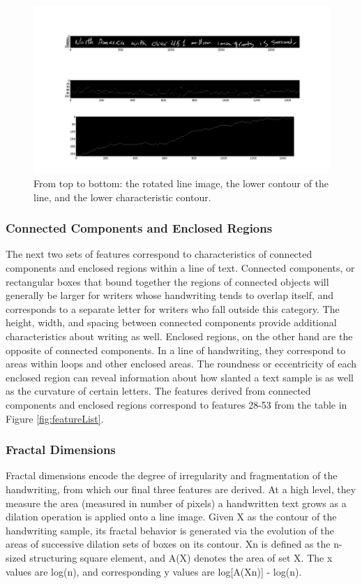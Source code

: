 \documentclass[paper=a4, fontsize=11pt]{scrartcl} %
\numberwithin{equation}{section} %
\numberwithin{figure}{section} %
\numberwithin{table}{section} %
\begin{document}
\begin{figure}
  \includegraphics{contourimage.png}
  \caption{From top to bottom: the rotated line image, the lower
    contour of the line, and the lower characteristic contour.}
  \label{fig:contourimage}
\end{figure}

\subsubsection{Connected Components and Enclosed Regions}
The next two sets of features correspond to characteristics of connected components and enclosed regions within a line of text. Connected components, or rectangular boxes that bound together the regions of connected objects will generally be larger for writers whose handwriting tends to overlap itself, and corresponds to a separate letter for writers who fall outside this category. The height, width, and spacing between connected components provide additional characteristics about writing as well. Enclosed regions, on the other hand are the opposite of connected components. In a line of handwriting, they correspond to areas within loops and other enclosed areas. The roundness or eccentricity of each enclosed region can reveal information about how slanted a text sample is as well as the curvature of certain letters. The features derived from connected components and enclosed regions correspond to features 28-53 from the table in Figure
\ref{fig:featureList}.

\subsubsection{Fractal Dimensions}
Fractal dimensions encode the degree of irregularity and fragmentation
of the handwriting, from which our final three features are
derived\cite{FractalDimensions}. At a high level, they measure the
area (measured in number of pixels) a handwritten text grows as a
dilation operation is applied onto a line image. Given X as the
contour of the handwriting sample, its fractal behavior is generated
via the evolution of the areas of successive dilation sets of boxes on
its contour. Xn is defined as the n-sized structuring square element,
and A(X) denotes the area of set X. The x values are log(n), and
corresponding y values are log[A(Xn)] - log(n).
\end{document}
